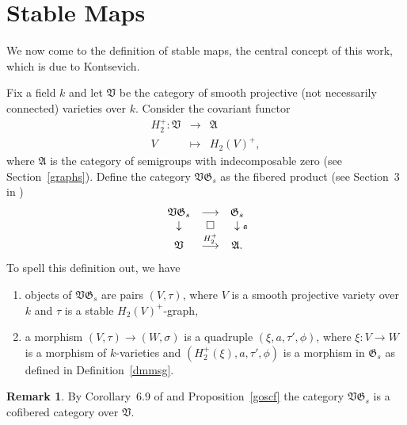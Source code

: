 \documentclass[11pt]{amsart}
\theoremstyle{definition}
\newtheorem{numrmk}[prop]{Remark}
\theoremstyle{remark}
\renewcommand{\AA}{{\mathfrak{A}}}
\newcommand{\GG}{{\mathfrak{G}}}
\newcommand{\VV}{{\mathfrak{V}}}
\newcommand{\Aa}{{\mathfrak{a}}}
\newcommand{\ldiag}[1]
       {\makebox[0cm]{\({\scriptstyle#1}\downarrow\phantom{\scriptstyle#1}\)}}
\newcommand{\rdiag}[1]
       {\makebox[0cm]{\(\phantom{\scriptstyle#1}\downarrow{\scriptstyle#1}\)}}
\newcommand{\comdia}[9]{
\begin{array}{ccc}
#1 & \stackrel{#2}{\longrightarrow} & #3 \\
\ldiag{#4} & #5 & \rdiag{#6} \\
#7 & \stackrel{#8}{\longrightarrow} & #9
\end{array}}
\theoremstyle{plain}
\theoremstyle{definition}
\theoremstyle{remark}
\begin{document}
\section{Stable Maps}

We now come to the definition of stable maps, the central concept of this work,
which is due to Kontsevich.

Fix a field \(k\) and let \(\VV\) be the category of smooth projective (not
necessarily connected) varieties over \(k\).
Consider the covariant functor
\begin{eqnarray*}
H_2^+:\VV & \longrightarrow & \AA \\
V & \longmapsto & H_2(V)^+,
\end{eqnarray*}
where \(\AA\) is the category of semigroups with indecomposable zero (see
Section~\ref{graphs}).
Define the category \(\VV\GG_s\) as the fibered product (see Section~3 in
\cite[Exp.\ ~VI]{sga1})
\[
\comdia{\VV\GG_s}{}{\GG_s}{}{\Box}{\Aa}{\VV}{H_2^+}{\AA.}
\]
To spell this definition out, we have
\begin{enumerate}
\item objects of \(\VV\GG_s\) are pairs \((V,\tau)\), where \(V\) is a smooth
projective variety over \(k\)
and \(\tau\) is a stable \(H_2(V)^+\)-graph,
\item a morphism \((V,\tau)\rightarrow (W,\sigma)\) is a quadruple
\((\xi,a,\tau',\phi)\), where
\(\xi:V\rightarrow W\) is a morphism of \(k\)-varieties and
\((H_2^+(\xi),a,\tau',\phi)\) is a morphism in \(\GG_s\) as defined in
Definition~\ref{dmmsg}.
\end{enumerate}

\begin{numrmk} \label{ugscf}
By Corollary~6.9 of \cite[Exp.\ ~VI]{sga1} and Proposition~\ref{goscf} the
category \(\VV\GG_s\) is a cofibered category
over \(\VV\).
\end{numrmk}
\end{document}
